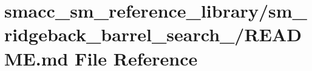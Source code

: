 \hypertarget{smacc__sm__reference__library_2sm__ridgeback__barrel__search__1_2README_8md}{}\section{smacc\+\_\+sm\+\_\+reference\+\_\+library/sm\+\_\+ridgeback\+\_\+barrel\+\_\+search\+\_/\+R\+E\+A\+D\+ME.md File Reference}
\label{smacc__sm__reference__library_2sm__ridgeback__barrel__search__1_2README_8md}
